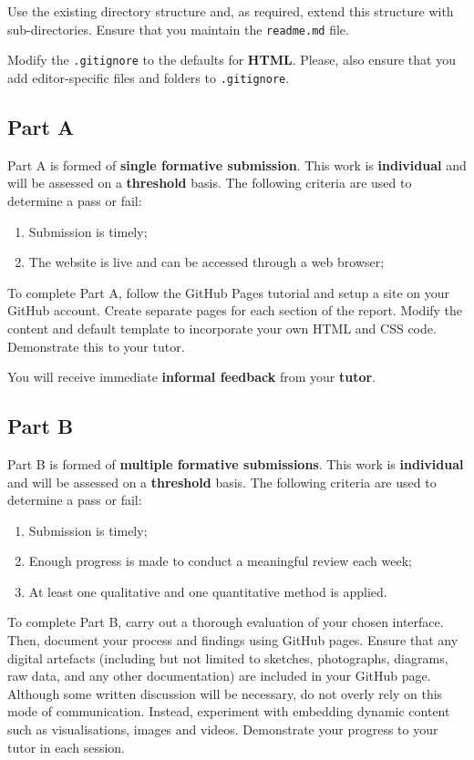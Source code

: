 \documentclass{../../fal_assignment}
\begin{document}
Use the existing directory structure and, as required, extend this structure with sub-directories. Ensure that you maintain the \texttt{readme.md} file.

Modify the \texttt{.gitignore} to the defaults for \textbf{HTML}. Please, also ensure that you add editor-specific files and folders to \texttt{.gitignore}. 

\subsection*{Part A}

Part A is formed of \textbf{single formative submission}. This work is \textbf{individual} and will be assessed on a \textbf{threshold} basis. The following criteria are used to determine a pass or fail:

\begin{enumerate}[label=(\alph*)]
	\item Submission is timely;
	\item The website is live and can be accessed through a web browser;
\end{enumerate}

To complete Part A, follow the GitHub Pages tutorial and setup a site on your GitHub account. Create separate pages for each section of the report. Modify the content and default template to incorporate your own HTML and CSS code. Demonstrate this to your tutor.

You will receive immediate \textbf{informal feedback} from your \textbf{tutor}.

\subsection*{Part B}

Part B is formed of \textbf{multiple formative submissions}. This work is \textbf{individual} and will be assessed on a \textbf{threshold} basis. The following criteria are used to determine a pass or fail:

\begin{enumerate}[label=(\alph*)]
	\item Submission is timely;
	\item Enough progress is made to conduct a meaningful review each week;
	\item At least one qualitative and one quantitative method is applied.
\end{enumerate}

To complete Part B, carry out a thorough evaluation of your chosen interface. Then, document your process and findings using GitHub pages. Ensure that any digital artefacts (including but not limited to sketches, photographs, diagrams, raw data, and any other documentation) are included in your GitHub page. Although some written discussion will be necessary, do not overly rely on this mode of communication. Instead, experiment with embedding dynamic content such as visualisations, images and videos. Demonstrate your progress to your tutor in each session.
\end{document}
